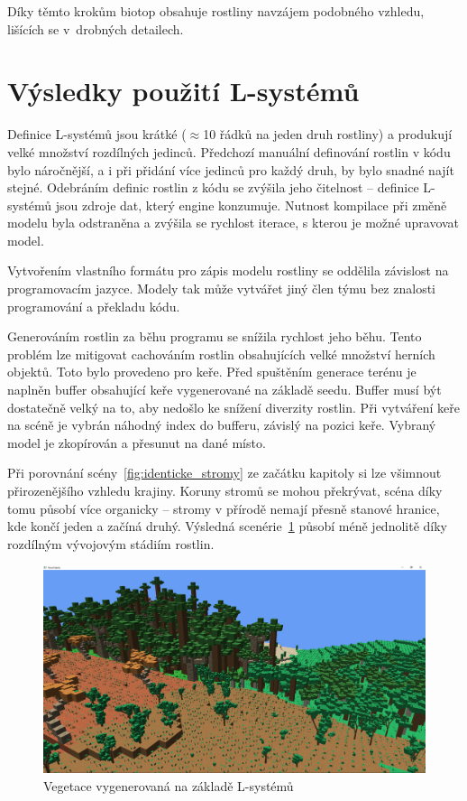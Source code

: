 \documentclass[thesis=M,czech]{FITthesis}[2019/12/23]
\begin{document}
Díky těmto krokům biotop obsahuje rostliny navzájem podobného vzhledu, lišících se v~drobných detailech.

\section{Výsledky použití L-systémů}
Definice L-systémů jsou krátké ($\approx$10 řádků na jeden druh rostliny) a produkují velké množství rozdílných jedinců. Předchozí manuální definování rostlin v kódu bylo náročnější, a i při přidání více jedinců pro každý druh, by bylo snadné najít stejné. Odebráním definic rostlin z kódu se zvýšila jeho čitelnost -- definice L-systémů jsou zdroje dat, který engine konzumuje. Nutnost kompilace při změně modelu byla odstraněna a zvýšila se rychlost iterace, s kterou je možné upravovat model.

Vytvořením vlastního formátu pro zápis modelu rostliny se oddělila závislost na programovacím jazyce. Modely tak může vytvářet jiný člen týmu bez znalosti programování a překladu kódu.

Generováním rostlin za běhu programu se snížila rychlost jeho běhu. Tento problém lze mitigovat cachováním rostlin obsahujících velké množství herních objektů. Toto bylo provedeno pro keře. Před spuštěním generace terénu je naplněn buffer obsahující keře vygenerované na základě seedu. Buffer musí být dostatečně velký na to, aby nedošlo ke snížení diverzity rostlin. Při vytváření keře na scéně je vybrán náhodný index do bufferu, závislý na pozici keře. Vybraný model je zkopírován a přesunut na dané místo.

Při porovnání scény~\ref{fig:identicke_stromy} ze začátku kapitoly si lze všimnout přirozenějšího vzhledu krajiny. Koruny stromů se mohou překrývat, scéna díky tomu působí více organicky -- stromy v přírodě nemají přesně stanové hranice, kde končí jeden a začíná druhý. Výsledná scenérie~\ref{fig:new_vegetation} působí méně jednolitě díky rozdílným vývojovým stádiím rostlin.

\begin{figure}\centering
	\includegraphics[width=\textwidth]{images/new_vegetation}
	\caption[Vegetace vygenerovaná na základě L-systémů]{Vegetace vygenerovaná na základě L-systémů}\label{fig:new_vegetation}
\end{figure}
\end{document}
